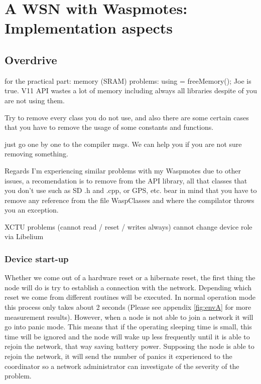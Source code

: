 \chapter{A WSN with Waspmotes: Implementation aspects} %
\label{Chapter4} %
\section{Overdrive}

for the practical part: memory (SRAM) problems:  using  = freeMemory();
Joe is true. V11 API wastes a lot of memory including always all libraries despite of you are not using them.

Try to remove every class you do not use, and also there are some certain cases that you have to remove the usage of some constants and functions.

just go one by one to the compiler msgs. We can help you if you are not sure removing something.

Regards
I'm experiencing similar problems with my Waspmotes due to other issues, a recomendation is to remove from the API library, all that classes that you don't use such as SD .h and .cpp, or GPS, etc. bear in mind that you have to remove any reference from the file WaspClasses and where the compilator throws you an exception.

XCTU problems (cannot read / reset / writes always)  cannot change device role via Libelium
  
\subsection{Device start-up}
Whether we come out of a hardware reset or a hibernate reset, the first thing the node will do is try to establish a connection with the network. Depending which reset we come from different routines will be executed. In normal operation mode this process only takes about 2 seconds (Please see appendix \ref{fig:envA} for more measurement results). However, when a node is not able to join a network it will go into panic mode. This means that if the operating sleeping time is small, this time will be ignored and the node will wake up less frequently until it is able to rejoin the network, that way saving battery power. Supposing the node is able to rejoin the network, it will send the number of panics it experienced to the coordinator so a network administrator can investigate of the severity of the problem.


